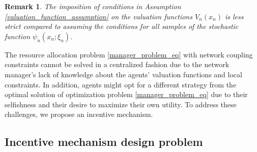 \documentclass[twocolumn]{autart}
\newtheorem{remark}{Remark}
\begin{document}
\begin{remark}
The imposition of conditions in Assumption \ref{valuation_function_assumption} on the valuation functions $V_n(x_n)$ is less strict compared to assuming the conditions for all samples of the stochastic function $\psi_n(x_n;\xi_n)$.
\end{remark}
The resource allocation problem \eqref{manager_problem_eq} with network coupling constraints cannot be solved in a centralized fashion due to the network manager's lack of knowledge about the agents' valuation functions and local constraints. In addition, agents might opt for a different strategy from the optimal solution of optimization problem \eqref{manager_problem_eq} due to their selfishness and their desire to maximize their own utility. To address these challenges, we propose an incentive mechanism.
%
\subsection{Incentive mechanism design problem}\label{machanism_design_subsec}
\end{document}
